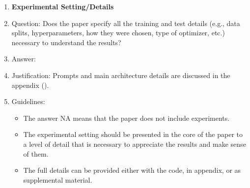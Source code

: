 \documentclass{article}
\begin{document}
\begin{enumerate}
\item {\bf Experimental Setting/Details}
    \item[] Question: Does the paper specify all the training and test details (e.g., data splits, hyperparameters, how they were chosen, type of optimizer, etc.) necessary to understand the results?
    \item[] Answer: \answerYes{} %
    \item[] Justification: Prompts and  main architecture details are discussed in the appendix ().
    \item[] Guidelines:
    \begin{itemize}
        \item The answer NA means that the paper does not include experiments.
        \item The experimental setting should be presented in the core of the paper to a level of detail that is necessary to appreciate the results and make sense of them.
        \item The full details can be provided either with the code, in appendix, or as supplemental material.
    \end{itemize}


\end{enumerate}
\end{document}
